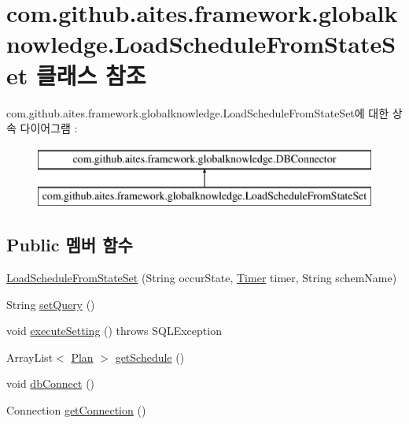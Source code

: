 \hypertarget{classcom_1_1github_1_1aites_1_1framework_1_1globalknowledge_1_1_load_schedule_from_state_set}{}\section{com.\+github.\+aites.\+framework.\+globalknowledge.\+Load\+Schedule\+From\+State\+Set 클래스 참조}
\label{classcom_1_1github_1_1aites_1_1framework_1_1globalknowledge_1_1_load_schedule_from_state_set}
com.\+github.\+aites.\+framework.\+globalknowledge.\+Load\+Schedule\+From\+State\+Set에 대한 상속 다이어그램 \+: \begin{figure}[H]
\begin{center}
\leavevmode
\includegraphics[height=2.000000cm]{classcom_1_1github_1_1aites_1_1framework_1_1globalknowledge_1_1_load_schedule_from_state_set}
\end{center}
\end{figure}
\subsection*{Public 멤버 함수}
\begin{DoxyCompactItemize}
\item 
\mbox{\hyperlink{classcom_1_1github_1_1aites_1_1framework_1_1globalknowledge_1_1_load_schedule_from_state_set_a7eae5d4171d4270ad2d1398291b2312f}{Load\+Schedule\+From\+State\+Set}} (String occur\+State, \mbox{\hyperlink{classcom_1_1github_1_1aites_1_1framework_1_1framework_1_1_timer}{Timer}} timer, String schem\+Name)
\item 
String \mbox{\hyperlink{classcom_1_1github_1_1aites_1_1framework_1_1globalknowledge_1_1_load_schedule_from_state_set_af87949de45e79de9110190b287be5df2}{set\+Query}} ()
\item 
void \mbox{\hyperlink{classcom_1_1github_1_1aites_1_1framework_1_1globalknowledge_1_1_load_schedule_from_state_set_a4361696ec935b78f28aba5de0c6c304d}{execute\+Setting}} ()  throws S\+Q\+L\+Exception 
\item 
Array\+List$<$ \mbox{\hyperlink{classcom_1_1github_1_1aites_1_1framework_1_1planner_1_1_plan}{Plan}} $>$ \mbox{\hyperlink{classcom_1_1github_1_1aites_1_1framework_1_1globalknowledge_1_1_load_schedule_from_state_set_a885b9e5c5ec0bc4372454b48851e3f31}{get\+Schedule}} ()
\item 
void \mbox{\hyperlink{classcom_1_1github_1_1aites_1_1framework_1_1globalknowledge_1_1_d_b_connector_a108808207e33b613b470855bb2be9223}{db\+Connect}} ()
\item 
Connection \mbox{\hyperlink{classcom_1_1github_1_1aites_1_1framework_1_1globalknowledge_1_1_d_b_connector_a94ff414cd6c3dcc402787d96136b5788}{get\+Connection}} ()
\end{DoxyCompactItemize}
